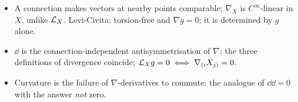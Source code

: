 \begin{keypoints}[Part IV]
\begin{itemize}
\item A connection makes vectors at nearby points comparable; $\nabla_X$ is $C^\infty$-linear in $X$, unlike $\mathcal{L}_X$. Levi-Civita: torsion-free and $\nabla g=0$; it is determined by $g$ alone.
\item $\dd$ is the connection-independent antisymmetrisation of $\nabla$; the three definitions of divergence coincide; $\mathcal{L}_Xg=0\iff\nabla_{(i}X_{j)}=0$.
\item Curvature is the failure of $\nabla$-derivatives to commute: the analogue of $\dd\dd=0$ with the answer \emph{not} zero.
\end{itemize}
\end{keypoints}
